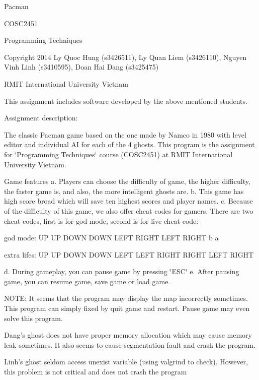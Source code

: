 Pacman

C\-O\-S\-C2451

Programming Techniques

Copyright 2014 Ly Quoc Hung (s3426511), Ly Quan Liem (s3426110), Nguyen Vinh Linh (s3410595), Doan Hai Dang (s3425475)

R\-M\-I\-T International University Vietnam

This assignment includes software developed by the above mentioned students.

Assignment description\-:

The classic Pacman game based on the one made by Namco in 1980 with level editor and individual A\-I for each of the 4 ghosts. This program is the assignment for \char`\"{}\-Programming Techniques\char`\"{} course (C\-O\-S\-C2451) at R\-M\-I\-T International University Vietnam.


\begin{DoxyEnumerate}
\item Game features a. Players can choose the difficulty of game, the higher difficulty, the faster game is, and also, the more intelligent ghosts are. b. This game has high score broad which will save ten highest scores and player names. c. Because of the difficulty of this game, we also offer cheat codes for gamers. There are two cheat codes, first is for god mode, second is for live cheat code\-:
\begin{DoxyItemize}
\item god mode\-: U\-P U\-P D\-O\-W\-N D\-O\-W\-N L\-E\-F\-T R\-I\-G\-H\-T L\-E\-F\-T R\-I\-G\-H\-T b a
\item extra lifes\-: U\-P U\-P D\-O\-W\-N D\-O\-W\-N L\-E\-F\-T L\-E\-F\-T R\-I\-G\-H\-T R\-I\-G\-H\-T L\-E\-F\-T R\-I\-G\-H\-T
\end{DoxyItemize}

d. During gameplay, you can pause game by pressing \char`\"{}\-E\-S\-C\char`\"{} e. After pausing game, you can resume game, save game or load game.

N\-O\-T\-E\-: It seems that the program may display the map incorrectly sometimes. This program can simply fixed by quit game and restart. Pause game may even solve this program.

Dang's ghost does not have proper memory allocation which may cause memory leak sometimes. It also seems to cause segmentation fault and crash the program.

Linh's ghost seldom access unexist variable (using valgrind to check). However, this problem is not critical and does not crash the program
\end{DoxyEnumerate}


